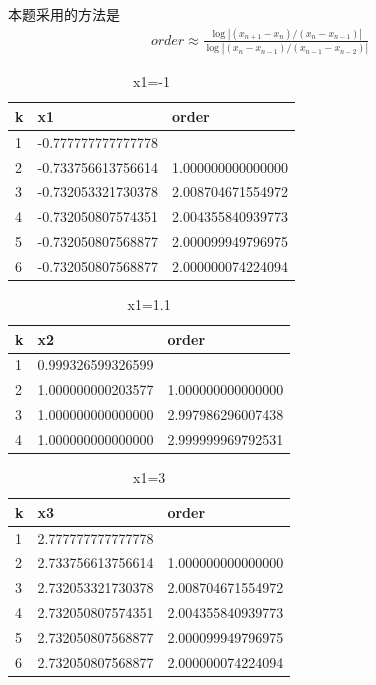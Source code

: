 \documentclass[12pt,a4paper,UTF8]{ctexart}
\begin{document}
\begin{enumerate}
	本题采用的方法是
	\begin{eqnarray*}
		order\approx \frac{\log \left|\left(x_{n+1}-x_{n}\right) /\left(x_{n}-x_{n-1}\right)\right|}{\log \left|\left(x_{n}-x_{n-1}\right) /\left(x_{n-1}-x_{n-2}\right)\right|} 
	\end{eqnarray*}
\begin{table}[H]
\centering
\begin{tabular}{|l|l|l|}
\hline
k & x1                 & order             \\ \hline
1 & -0.777777777777778 &                   \\ \hline
2 & -0.733756613756614 & 1.000000000000000 \\ \hline
3 & -0.732053321730378 & 2.008704671554972 \\ \hline
4 & -0.732050807574351 & 2.004355840939773 \\ \hline
5 & -0.732050807568877 & 2.000099949796975 \\ \hline
6 & -0.732050807568877 & 2.000000074224094 \\ \hline
\end{tabular}
\caption{x1=-1}
\end{table}
\begin{table}[H]
\centering
\begin{tabular}{|l|l|l|}
\hline
k & x2                & order             \\ \hline
1 & 0.999326599326599 &                   \\ \hline
2 & 1.000000000203577 & 1.000000000000000 \\ \hline
3 & 1.000000000000000 & 2.997986296007438 \\ \hline
4 & 1.000000000000000 & 2.999999969792531 \\ \hline
\end{tabular}
\caption{x1=1.1}
\end{table}
\begin{table}[H]
\centering
\begin{tabular}{|l|l|l|}
\hline
k & x3                & order             \\ \hline
1 & 2.777777777777778 &                   \\ \hline
2 & 2.733756613756614 & 1.000000000000000 \\ \hline
3 & 2.732053321730378 & 2.008704671554972 \\ \hline
4 & 2.732050807574351 & 2.004355840939773 \\ \hline
5 & 2.732050807568877 & 2.000099949796975 \\ \hline
6 & 2.732050807568877 & 2.000000074224094 \\ \hline
\end{tabular}
\caption{x1=3}
\end{table}


\end{enumerate}
\end{document}
